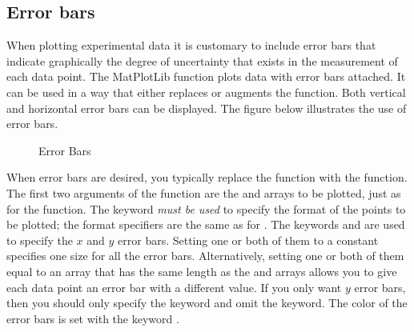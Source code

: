 \documentclass[letterpaper,10pt,english]{sphinxmanual}
\begin{document}
\subsection{Error bars}
\label{chap5/chap5_plot:error-bars}
When plotting experimental data it is customary to include error bars that indicate graphically the degree of uncertainty that exists in the measurement of each data point.  The MatPlotLib function  plots data with error bars attached.  It can be used in a way that either replaces or augments the  function.  Both vertical and horizontal error bars can be displayed.  The figure below illustrates the use of error bars.
\begin{figure}[htbp]
\centering
\capstart

\caption{Error Bars}\label{chap5/chap5_plot:fig-expdecay}\end{figure}

When error bars are desired, you typically replace the  function with the  function.  The first two arguments of the   function are the  and  arrays to be plotted, just as for the  function.  The keyword  \emph{must be used} to specify the format of the points to be plotted; the format specifiers are the same as for .  The keywords  and  are used to specify the $x$ and $y$ error bars.  Setting one or both of them to a constant specifies one size for all the error bars.  Alternatively, setting one or both of them equal to an array that has the same length as the  and  arrays allows you to give each data point an error bar with a different value.  If you only want $y$ error bars, then you should only specify the  keyword and omit the  keyword.  The color of the error bars is set with the keyword .
\end{document}
